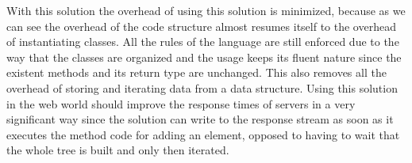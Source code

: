 \noindent
With this solution the overhead of using this solution is minimized, because as we can see the overhead of the code structure almost resumes itself to the overhead of instantiating classes. All the rules of the language are still enforced due to the way that the classes are organized and the usage keeps its fluent nature since the existent methods and its return type are unchanged. This also removes all the overhead of storing and iterating data from a data structure. Using this solution in the web world should improve the response times of servers in a very significant way since the solution can write to the response stream as soon as it executes the method code for adding an element, opposed to having to wait that the whole tree is built and only then iterated. 